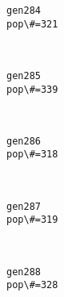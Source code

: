 \documentclass[11pt]{article}
\begin{document}
    \begin{Verbatim}[commandchars=\\\{\}]
gen284
pop\#=321

    \end{Verbatim}

    \begin{center}
    \end{center}
    { \hspace*{\fill} \\}
    
    \begin{Verbatim}[commandchars=\\\{\}]
gen285
pop\#=339

    \end{Verbatim}

    \begin{center}
    \end{center}
    { \hspace*{\fill} \\}
    
    \begin{Verbatim}[commandchars=\\\{\}]
gen286
pop\#=318

    \end{Verbatim}

    \begin{center}
    \end{center}
    { \hspace*{\fill} \\}
    
    \begin{Verbatim}[commandchars=\\\{\}]
gen287
pop\#=319

    \end{Verbatim}

    \begin{center}
    \end{center}
    { \hspace*{\fill} \\}
    
    \begin{Verbatim}[commandchars=\\\{\}]
gen288
pop\#=328

    \end{Verbatim}
\end{document}

